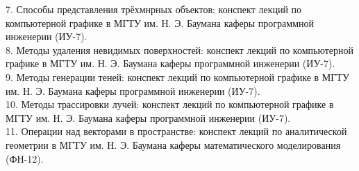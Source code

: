 \hspace{-1.25cm}
7. Способы представления трёхмнрных объектов:
конспект лекций по компьютерной графике в МГТУ им. Н. Э. Баумана
каферы программной инженерии (ИУ-7). \\

\hspace{-1.25cm}
8. Методы удаления невидимых поверхностей:
конспект лекций по компьютерной графике в МГТУ им. Н. Э. Баумана
каферы программной инженерии (ИУ-7). \\

\hspace{-1.25cm}
9. Методы генерации теней:
конспект лекций по компьютерной графике в МГТУ им. Н. Э. Баумана
каферы программной инженерии (ИУ-7). \\

\hspace{-1.25cm}
10. Методы трассировки лучей:
конспект лекций по компьютерной графике в МГТУ им. Н. Э. Баумана
каферы программной инженерии (ИУ-7). \\

\hspace{-1.25cm}
11. Операции над векторами в пространстве: конспект лекций по аналитической геометрии в
МГТУ им. Н. Э. Баумана каферы математического моделирования (ФН-12). \\